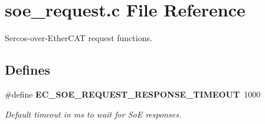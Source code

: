 \section{soe\-\_\-request.\-c \-File \-Reference}
\label{soe__request_8c}


\-Sercos-\/over-\/\-Ether\-C\-A\-T request functions.  


\subsection*{\-Defines}
\begin{DoxyCompactItemize}
\item 
\#define {\bf \-E\-C\-\_\-\-S\-O\-E\-\_\-\-R\-E\-Q\-U\-E\-S\-T\-\_\-\-R\-E\-S\-P\-O\-N\-S\-E\-\_\-\-T\-I\-M\-E\-O\-U\-T}~1000\label{soe__request_8c_a4a6708f336ebb21896abbd6b9c272ec2}

\begin{DoxyCompactList}\small\item\em \-Default timeout in ms to wait for \-So\-E responses. \end{DoxyCompactList}\end{DoxyCompactItemize}
